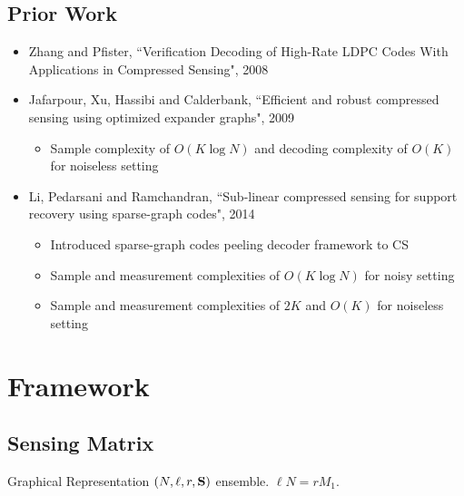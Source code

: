 \documentclass[10pt]{beamer}
\begin{document}
\subsection{Prior Work}
\begin{frame}
\begin{itemize}
\item Zhang and Pfister, ``Verification Decoding of High-Rate LDPC Codes With Applications in Compressed Sensing", 2008
\item  Jafarpour, Xu, Hassibi and Calderbank, ``Efficient and robust compressed sensing using optimized expander graphs", 2009
\begin{itemize}
\item Sample complexity of $O(K\log N)$ and decoding complexity of $O(K)$ for noiseless setting
\end{itemize}

\vspace{3ex}
\item Li, Pedarsani and Ramchandran, ``Sub-linear compressed sensing for support recovery using sparse-graph codes", 2014
\begin{itemize}
\item Introduced sparse-graph codes peeling decoder framework to CS
\item Sample and measurement complexities of $O(K\log N)$ for noisy setting
\item Sample and measurement complexities of $2K$ and $O(K)$ for noiseless setting
\end{itemize}
\end{itemize}
\end{frame}

\section{Framework}
\subsection{Sensing Matrix}
\begin{frame}{Graphical Representation}
$(N,\ell,r,\mathbf{S})$ ensemble. $\ell N=rM_1$. 
\begin{figure}
\scalebox{1.3}{}
\end{figure}
\end{frame}
\end{document}
